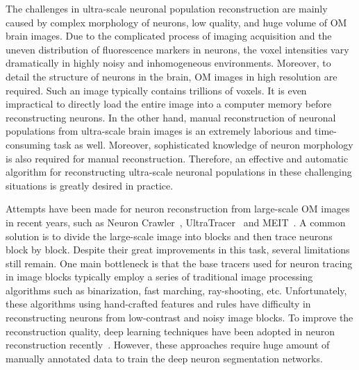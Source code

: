 The challenges in ultra-scale neuronal population reconstruction are mainly caused by complex morphology of neurons, low quality, and huge volume of OM brain images.
Due to the complicated process of imaging acquisition and the uneven distribution of fluorescence markers in neurons, the voxel intensities vary dramatically in highly noisy and inhomogeneous environments.
Moreover, to detail the structure of neurons in the brain, OM images in high resolution are required. Such an image typically contains trillions of voxels. It is even impractical to directly load the entire image into a computer memory before reconstructing neurons.
In the other hand, manual reconstruction of neuronal populations from ultra-scale brain images is an extremely laborious and time-consuming task as well.
Moreover, sophisticated knowledge of neuron morphology is also required for manual reconstruction.
%
Therefore, an effective and automatic algorithm for reconstructing ultra-scale neuronal populations in these challenging situations is greatly desired in practice.
 
 
Attempts have been made for neuron reconstruction from large-scale OM images in recent years, such as Neuron Crawler~\cite{Zhou2015}, UltraTracer~\cite{Peng2017} and MEIT~\cite{Wang2018}.
A common solution is to divide the large-scale image into blocks and then trace neurons block by block.
Despite their great improvements in this task, several limitations still remain.
%
One main bottleneck is that the base tracers used for neuron tracing in image blocks typically employ a series of traditional image processing algorithms such as binarization, fast marching, ray-shooting, etc. 
Unfortunately, these algorithms using hand-crafted features and rules have difficulty in reconstructing neurons from low-contrast and noisy image blocks.
To improve the reconstruction quality, deep learning techniques have been adopted in neuron reconstruction recently~\cite{Xu2016, Li2017, Zhou2018, Kozinski-MIA2020}. 
However, these approaches require huge amount of manually annotated data to train the deep neuron segmentation networks.
%

